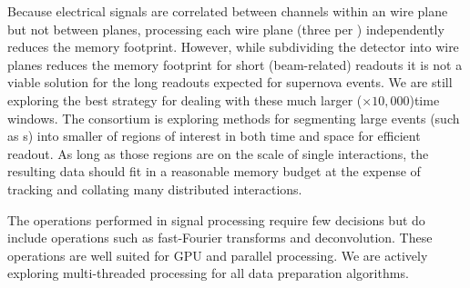 Because electrical signals are correlated between channels within an  wire plane but not between planes, processing each wire plane (three per ) independently reduces the memory footprint.
However,  while subdividing the detector into wire planes reduces the memory footprint for short (beam-related) readouts it is  not a viable solution for the long readouts expected for supernova events. We are still exploring the best strategy for dealing with these much larger ($\times 10,000$)time windows. 
The  consortium is exploring methods for segmenting large events (such as s) into  smaller of regions of interest in both time and space for efficient readout.  As long as those regions are on the scale of single interactions, the resulting data should fit in a reasonable memory budget at the expense of tracking and collating many distributed interactions. 

The operations performed in signal processing require few decisions but do include operations such as fast-Fourier transforms and deconvolution.  These operations are well suited for GPU and parallel processing. We are actively exploring multi-threaded processing for all data preparation algorithms. 


%
